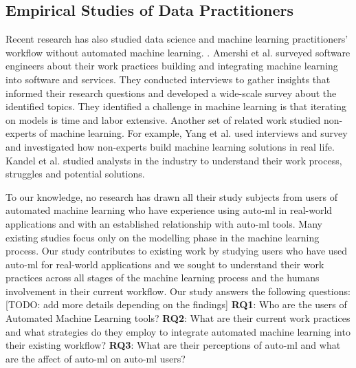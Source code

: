\subsection{Empirical Studies of Data Practitioners}
Recent research has also studied data science and machine learning practitioners' workflow without automated machine learning. \cite{}. Amershi et al. surveyed software engineers about their work practices building and integrating machine learning into software and services. They conducted interviews to gather insights that informed their research questions and developed a wide-scale survey about the identified topics. They identified a challenge in machine learning is that iterating on models is time and labor extensive. Another set of related work studied non-experts of machine learning. For example, Yang et al. used interviews and survey and investigated how non-experts build machine learning solutions in real life. \cite{YangNonExpert} Kandel et al. studied analysts in the industry to understand their work process, struggles and potential solutions. \cite{Kandel}

To our knowledge, no research has drawn all their study subjects from users of automated machine learning who have experience using auto-ml in real-world applications and with an established relationship with auto-ml tools. Many existing studies focus only on the modelling phase in the machine learning process. Our study contributes to existing work by studying users who have used auto-ml for real-world applications and we sought to understand their work practices across all stages of the machine learning process and the humans involvement in their current workflow. 
Our study answers the following questions:[TODO: add more details depending on the findings]
\textbf{RQ1}: Who are the users of Automated Machine Learning tools?
\textbf{RQ2}: What are their current work practices and what strategies do they employ to integrate automated machine learning into their existing workflow?
\textbf{RQ3}: What are their perceptions of auto-ml and what are the affect of auto-ml on auto-ml users?













